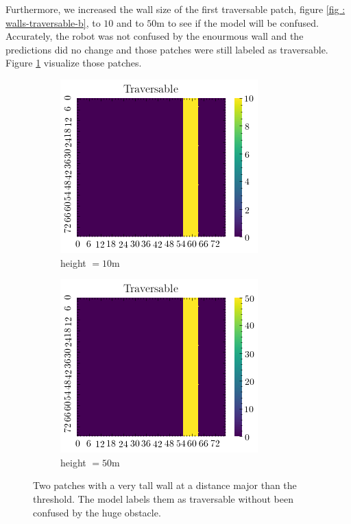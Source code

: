 \documentclass[../document.tex]{subfiles}
\begin{document}
Furthermore, we increased the wall size of the first traversable patch, figure \ref{fig : walls-traversable-b}, to $10$ and to $50$m to see if the model will be confused. Accurately, the robot was not confused by the enourmous wall and the predictions did no change and those patches were still labeled as traversable. Figure \ref{fig : walls-tall} visualize those patches.
\begin{figure}[htbp]
    \centering
    \begin{subfigure}[b]{0.33\linewidth}
        \includegraphics[width=\linewidth]{../img/5/custom_patches/walls_front/big-1-2d.png}
    \caption{height $=10$m}
    \end{subfigure}   
    \begin{subfigure}[b]{0.33\linewidth}
        \includegraphics[width=\linewidth]{../img/5/custom_patches/walls_front/big-2-2d.png}
        \caption{height $=50$m}
    \end{subfigure}   
\caption{Two patches with a very tall wall at a distance major than the threshold. The model labels them as traversable without been confused by the huge obstacle.}    
\label{fig : walls-tall}
\end{figure}
\end{document}
